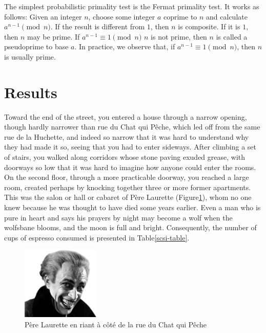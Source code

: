 \documentclass[11pt]{article}
\begin{document}
The simplest probabilistic primality test is the Fermat primality
test. It works as follows: Given an integer $n$, choose some integer
$a$ coprime to $n$ and calculate $a^{n - 1} \pmod{n}$. If the result
is different from $1$, then $n$ is composite. If it is $1$, then
$n$ may be prime. If $a^{n-1} \equiv 1 \pmod{n}$ $n$ is not prime,
then $n$ is called a pseudoprime to base $a$. In practice, we
observe that, if $a^{n-1} \equiv 1 \pmod{n}$, then $n$ is usually
prime.

\section{Results}\label{ss:result}

Toward the end of the street, you entered a house through a narrow
opening, though hardly narrower than rue du Chat qui P\^{e}che, which
led off from the same rue de la Huchette, and indeed so narrow that
it was hard to understand why they had made it so, seeing that you
had to enter sideways. After climbing a set of stairs, you walked
along corridors whose stone paving exuded grease, with doorways so
low that it was hard to imagine how anyone could enter the rooms.
On the second floor, through a more practicable doorway, you reached
a large room, created perhaps by knocking together three or more
former apartments. This was the salon or hall or cabaret of P\`{e}re
Laurette (Figure\xspace\ref{pere}), whom no one knew because he was thought to have died some
years earlier.
Even a man who is pure in heart and says his prayers by night may become a wolf when the wolfsbane blooms, and the moon is full and bright.
Consequently, the number of cups of espresso consumed is presented in Table\xspace\ref{scsi-table}.

\begin{figure}[tbh]
        \centering
        \includegraphics[width=0.33\textwidth]{images/cv.png}
        \caption{P\`ere Laurette en riant \`a c\^ot\'e de la rue du Chat qui P\^{e}che}\label{pere}
\end{figure}
\end{document}
